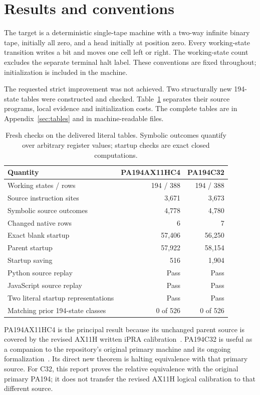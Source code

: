\documentclass[11pt,letterpaper]{article}
\begin{document}
\section{Results and conventions}

The target is a deterministic single-tape machine with a two-way infinite binary tape, initially all zero, and a head initially at position zero. Every working-state transition writes a bit and moves one cell left or right. The working-state count excludes the separate terminal halt label. These conventions are fixed throughout; initialization is included in the machine.

The requested strict improvement was not achieved. Two structurally new 194-state tables were constructed and checked. Table~\ref{tab:results} separates their source programs, local evidence and initialization costs. The complete tables are in Appendix~\ref{sec:tables} and in machine-readable files.

\begin{table}[ht]
\centering\small
\begin{tabular}{lrr}
\toprule
Quantity&PA194AX11HC4&PA194C32\\
\midrule
Working states / rows&194 / 388&194 / 388\\
Source instruction sites&3,671&3,673\\
Symbolic source outcomes&4,778&4,780\\
Changed native rows&6&7\\
Exact blank startup&57,406&56,250\\
Parent startup&57,922&58,154\\
Startup saving&516&1,904\\
Python source replay&Pass&Pass\\
JavaScript source replay&Pass&Pass\\
Two literal startup representations&Pass&Pass\\
Matching prior 194-state classes&0 of 526&0 of 526\\
\bottomrule
\end{tabular}
\caption{Fresh checks on the delivered literal tables. Symbolic outcomes quantify over arbitrary register values; startup checks are exact closed computations.}\label{tab:results}
\end{table}

PA194AX11HC4 is the principal result because its unchanged parent source is covered by the revised AX11H written iPRA calibration~\cite{ax11hclaim,ax11hfinal}. PA194C32 is useful as a companion to the repository's original primary machine and its ongoing formalization~\cite{pareadme,primary}. Its direct new theorem is halting equivalence with that primary source. For C32, this report proves the relative equivalence with the original primary PA194; it does not transfer the revised AX11H logical calibration to that different source.
\end{document}
